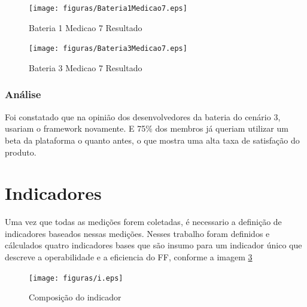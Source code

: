 \begin{figure}[H]
  \centering
  \label{fig:indicadores}
  \texttt{[image: figuras/Bateria1Medicao7.eps]}
  \caption{Bateria 1 Medicao 7 Resultado}
\end{figure}


\begin{figure}[H]
  \centering
  \label{fig:indicadores}
  \texttt{[image: figuras/Bateria3Medicao7.eps]}
  \caption{Bateria 3 Medicao 7 Resultado}
\end{figure}



\subsubsection{Análise}

Foi constatado que na opinião dos desenvolvedores da bateria do cenário 3, usariam o framework novamente. E
75\% dos membros já queriam utilizar um beta da plataforma o quanto antes, o que mostra uma alta taxa de satisfação
do produto.

\section{Indicadores}

Uma vez que todas as medições forem coletadas, é necessario a definição de indicadores baseados nessas medições.
Nesses trabalho foram definidos e cálculados quatro indicadores bases que são insumo para um indicador único que descreve
a operabilidade e a eficiencia do FF, conforme a imagem \ref{fig:indicadores}

\begin{figure}[H]
  \centering
  \label{fig:indicadores}
  \texttt{[image: figuras/i.eps]}
  \caption{Composição do indicador}
\end{figure}
